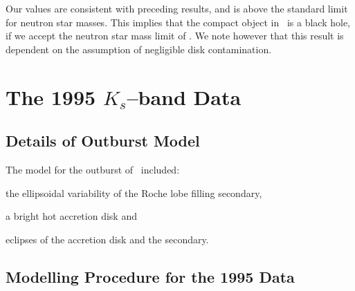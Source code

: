 \vspace{\myparskip}

Our values are consistent with preceding results, and is above the
standard limit for neutron star masses. This implies that the compact
object in \groj\ is a black hole, if we accept the neutron star mass limit of . We note however that this result is dependent on the assumption of negligible disk contamination. %


\section{The 1995 $K_s$--band Data}\label{cha:ELC:sec:1995Results}


\subsection{Details of Outburst Model}\label{cha:ELC:sec:1995Results:subsec:model}

The model for the outburst of \groj\ included:
\begin{inparaenum}[(i)]
\item
the ellipsoidal variability of the Roche lobe filling secondary,
\item
a bright hot accretion disk and
\item
eclipses of the accretion disk and the secondary.
\end{inparaenum}


\subsection{Modelling Procedure for the 1995 Data}\label{cha:ELC:sec:1995Results:subsec:ModellingProcedure}

